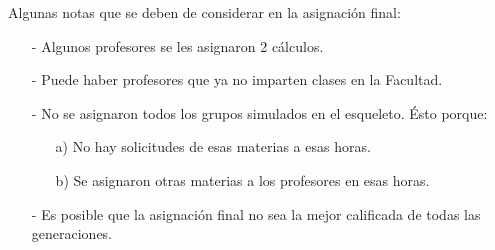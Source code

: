 Algunas notas que se deben de considerar en la asignación final:

\begin{itemize}
\item[-] Algunos profesores se les asignaron 2 cálculos.

\item[-] Puede haber profesores que ya no imparten clases en la Facultad.

\item[-] No se asignaron todos los grupos simulados en el esqueleto. Ésto porque:

\begin{itemize}
\item[a)] No hay solicitudes de esas materias a esas horas.

\item[b)] Se asignaron otras materias a los profesores en esas horas.
\end{itemize}

\item[-] Es posible que la asignación final no sea la mejor calificada de todas las generaciones.
\end{itemize}


